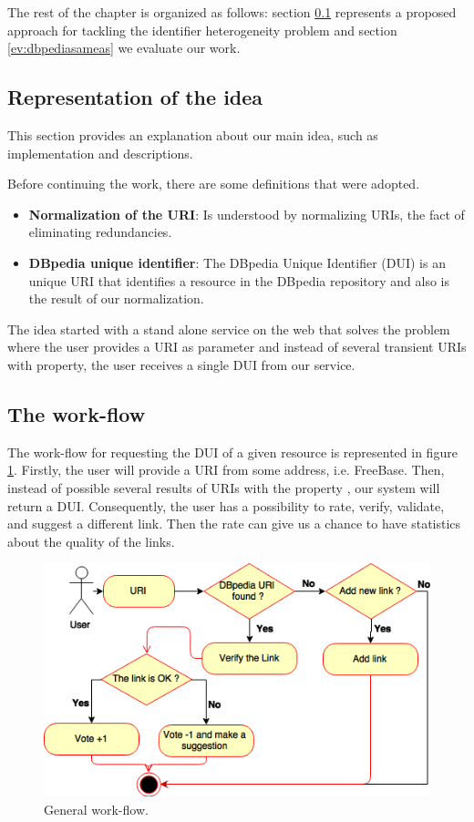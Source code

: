 The rest of the chapter is organized as follows: 
section \ref{representationidea} represents a proposed approach for tackling the identifier heterogeneity problem and section \ref{ev:dbpediasameas} we evaluate our work.


\subsection{Representation of the idea}\label{representationidea}

This section provides an explanation about our main idea, such as implementation and descriptions.

Before continuing the work, there are some definitions that were adopted.
\begin{itemize}
\item  \textbf{Normalization of the URI}: Is understood by normalizing URIs, the fact of eliminating redundancies.

\item \textbf{DBpedia unique identifier}: The DBpedia Unique Identifier (DUI) is an unique URI that identifies a resource in the DBpedia repository and also is the result of our normalization.
\end{itemize}

The idea started with a stand alone service on the web that solves the problem where the user provides a URI as parameter and instead of several transient URIs with  property, the user receives a single DUI from our service.

\subsection{The work-flow}
The work-flow for requesting the DUI of a given resource is represented in  figure \ref{fig:generalworkflow}.
Firstly, the user will provide a URI from some address, i.e. FreeBase. Then, instead of possible several results of URIs with the property , our system will return a DUI. Consequently, the user has a possibility to rate, verify, validate, and suggest a different link. Then the rate can give us a chance to have statistics about the quality of the links.

\begin{figure}[hbt] 
  	\centering
	\includegraphics[width=\columnwidth]{img/generalFlow.png}
 	\caption{General work-flow.}
  	\label{fig:generalworkflow}
\end{figure}


